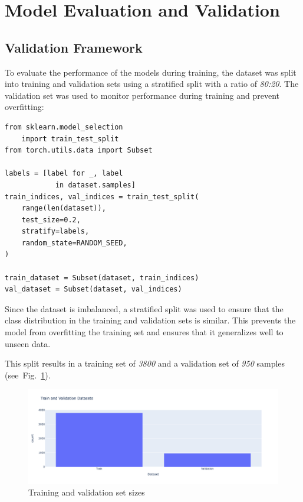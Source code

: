 \section{Model Evaluation and Validation}

\subsection{Validation Framework}

To evaluate the performance of the models during training, the dataset was split into training and validation sets using a stratified split with a ratio of \textit{80:20}. The validation set was used to monitor performance during training and prevent overfitting:

\begin{minipage}{0.9\linewidth}\begin{lstlisting}[caption={Stratified split of the dataset into training and validation sets.},label={lst-train-vald-split}]
from sklearn.model_selection
    import train_test_split
from torch.utils.data import Subset

labels = [label for _, label
            in dataset.samples]
train_indices, val_indices = train_test_split(
    range(len(dataset)),
    test_size=0.2,
    stratify=labels,
    random_state=RANDOM_SEED,
)

train_dataset = Subset(dataset, train_indices)
val_dataset = Subset(dataset, val_indices)
\end{lstlisting}\end{minipage}

Since the dataset is imbalanced, a stratified split was used to ensure that the class distribution in the training and validation sets is similar. This prevents the model from overfitting the training set and ensures that it generalizes well to unseen data.

This split results in a training set of \textit{3800} and a validation set of \textit{950} samples (see~Fig.~\ref{fig:train-vald-split}).

\begin{figure}[htbp]
    \centerline{\includegraphics[width=0.9\linewidth]{../../resources/train_vald_split.png}}
    \caption{Training and validation set sizes}
    \label{fig:train-vald-split}
\end{figure}

